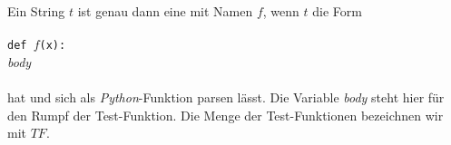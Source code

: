 \begin{Definition} 
Ein String $t$ ist genau dann eine  mit Namen $f$, wenn $t$ 
 die Form \\[0.3cm]
\hspace*{1.3cm} \texttt{}         \\
\hspace*{1.3cm} \texttt{def $f$(x):} \\
\hspace*{1.8cm} \textsl{body}        \\
\hspace*{1.3cm} \texttt{}         \\[0.2cm]
hat und sich als \textsl{Python}-Funktion parsen lässt.  Die Variable \textsl{body} steht hier für den Rumpf
der Test-Funktion.  Die Menge der Test-Funktionen bezeichnen wir mit $T\!F$.  \eox
\end{Definition}

